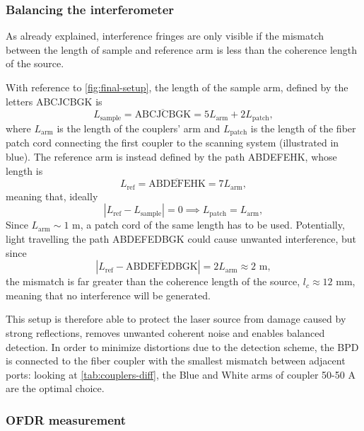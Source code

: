 \subsubsection{Balancing the interferometer}
As already explained, interference fringes are only visible if the mismatch between the length of sample and reference arm is less than the coherence length of the source.

With reference to \autoref{fig:final-setup}, the length of the sample arm, defined by the letters ABCJCBGK is
\begin{equation}
L_{\text{sample}} = \overline{\text{ABCJCBGK}} = 5L_{\text{arm}} + 2L_{\text{patch}},
\end{equation}
where $L_{\text{arm}}$ is the length of the couplers' arm and $L_{\text{patch}}$ is the length of the fiber patch cord connecting the first coupler to the scanning system (illustrated in blue). The reference arm is instead defined by the path ABDEFEHK, whose length is
\begin{equation}
	L_{\text{ref}} = \overline{\text{ABDEFEHK}} = 7L_{\text{arm}},
\end{equation}
meaning that, ideally
\begin{equation}
	| L_{\text{ref}} - L_{\text{sample}}| = 0 \implies L_{\text{patch}} = L_{\text{arm}},
\end{equation}
Since $L_{\text{arm}} \sim 1$ m, a patch cord of the same length has to be used. Potentially, light travelling the path ABDEFEDBGK could cause unwanted interference, but since
\begin{equation}
| L_{\text{ref}} - \overline{\text{ABDEFEDBGK}}| = 2L_{\text{arm}} \approx 2 \text{ m},
\end{equation}
the mismatch is far greater than the coherence length of the source, $l_c \approx 12$ mm, meaning that no interference will be generated. 

This setup is therefore able to protect the laser source from damage caused by strong reflections, removes unwanted coherent noise and enables balanced detection. In order to minimize distortions due to the detection scheme, the BPD is connected to the fiber coupler with the smallest mismatch between adjacent ports: looking at \autoref{tab:couplers-diff}, the Blue and White arms of coupler 50-50 A are the optimal choice. 

\subsubsection{OFDR measurement}

